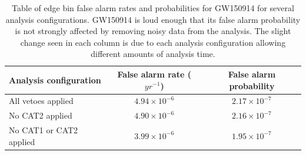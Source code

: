 \begin{table}[!ht]%
  \begin{center}
    \begin{tabular}{lcc}
      \hline
      Analysis configuration & False alarm rate ($yr^{-1}$) & False alarm probability \\ \hline
      All vetoes applied & $4.94\times10^{-6}$ & $2.17\times10^{-7}$ \\
      No CAT2 applied & $4.90\times10^{-6}$ & $2.16\times10^{-7}$ \\
      No CAT1 or CAT2 applied & $3.99\times10^{-6}$ & $1.95\times10^{-7}$ \\
      \hline
    \end{tabular}
  \end{center}
  \caption[GW150914 FAR]{Table of edge bin false alarm rates and probabilities for GW150914 for several analysis %
           configurations. GW150914 is loud enough that its false alarm probability %
           is not strongly affected by removing noisy data from the analysis. The slight change seen %
           in each column is due to each analysis configuration allowing different amounts of %
           analysis time. %
           }
  \label{table:150914-far}
\end{table}

